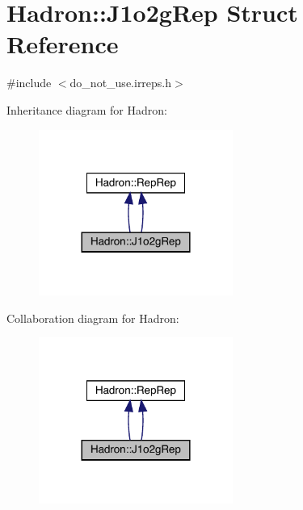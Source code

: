 \hypertarget{structHadron_1_1J1o2gRep}{}\section{Hadron\+:\+:J1o2g\+Rep Struct Reference}
\label{structHadron_1_1J1o2gRep}


{\ttfamily \#include $<$do\+\_\+not\+\_\+use.\+irreps.\+h$>$}



Inheritance diagram for Hadron\+:
\nopagebreak
\begin{figure}[H]
\begin{center}
\leavevmode
\includegraphics[width=180pt]{df/dbb/structHadron_1_1J1o2gRep__inherit__graph}
\end{center}
\end{figure}


Collaboration diagram for Hadron\+:
\nopagebreak
\begin{figure}[H]
\begin{center}
\leavevmode
\includegraphics[width=180pt]{d6/d45/structHadron_1_1J1o2gRep__coll__graph}
\end{center}
\end{figure}
